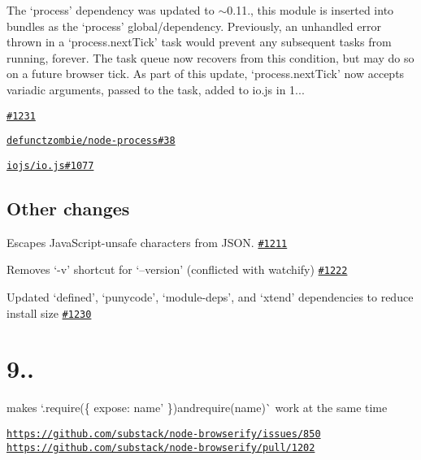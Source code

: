 The ‘process’ dependency was updated to $\sim$0.11., this module is inserted into bundles as the ‘process’ global/dependency. Previously, an unhandled error thrown in a ‘process.\+next\+Tick’ task would prevent any subsequent tasks from running, forever. The task queue now recovers from this condition, but may do so on a future browser tick. As part of this update, ‘process.\+next\+Tick’ now accepts variadic arguments, passed to the task, added to io.\+js in 1...


\begin{DoxyItemize}
\item \href{https://github.com/substack/node-browserify/pull/1231}{\tt \#1231}
\item \href{https://github.com/defunctzombie/node-process/pull/38}{\tt defunctzombie/node-\/process\#38}
\item \href{https://github.com/iojs/io.js/pull/1077}{\tt iojs/io.\+js\#1077}
\end{DoxyItemize}

\subsection*{Other changes}


\begin{DoxyItemize}
\item Escapes Java\+Script-\/unsafe characters from J\+S\+ON. \href{https://github.com/substack/node-browserify/pull/1211}{\tt \#1211}
\item Removes ‘-\/v’ shortcut for ‘--version’ (conflicted with watchify) \href{https://github.com/substack/node-browserify/pull/1222}{\tt \#1222}
\item Updated ‘defined’, ‘punycode’, ‘module-\/deps’, and ‘xtend’ dependencies to reduce install size \href{https://github.com/substack/node-browserify/pull/1230}{\tt \#1230}
\end{DoxyItemize}

\section*{9..}

makes `.require(\{ expose\+: \textquotesingle{}name' \}){\ttfamily and}require(\textquotesingle{}name\textquotesingle{})\`{} work at the same time

\href{https://github.com/substack/node-browserify/issues/850}{\tt https\+://github.\+com/substack/node-\/browserify/issues/850} \href{https://github.com/substack/node-browserify/pull/1202}{\tt https\+://github.\+com/substack/node-\/browserify/pull/1202}

